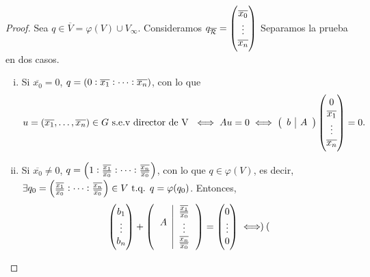  \begin{proof}
   Sea $q \in \overline{V} = \varphi(V) \cup V_\infty$. 
   Consideramos $q_{\overline{\mathcal{R}}} = \begin{pmatrix}
     \overline{x_0} \\ \vdots \\ \overline{x_n} 
   \end{pmatrix}$
   Separamos la prueba en dos casos.
   \begin{enumerate}[i)]
       \item Si $\overline{x_0} = 0$, $q = \left( 0:\overline{x_1}:\dots:\overline{x_n}\right)$, con
         lo que
         \[u = \left( \overline{x_1},\dots,\overline{x_n} \right) \in G \text{ s.e.v director
         de V } \iff Au = 0 \iff 
         \left( 
         \begin{array}{c|c} 
           b & A 
         \end{array}
         \right)
         \begin{pmatrix}
           0 \\
           \overline{x_1} \\
           \vdots \\
           \overline{x_n}
         \end{pmatrix}
         = 0.
       \]
     \item Si $\overline{x_0} \neq 0$, $q = \left( 1 : \frac{\overline{x_1}}{\overline{x_0}}
       : \dots : \frac{\overline{x_n}}{\overline{x_0}} \right)$, con lo que $q \in \varphi(V)$,
       es decir, $\exists q_0 =  \left( \frac{\overline{x_1}}{\overline{x_0}}
       : \dots : \frac{\overline{x_n}}{\overline{x_0}} \right) \in V \text{ t.q. } 
       q = \varphi(q_0)$. Entonces, 
       \begin{gather*} 
   \begin{pmatrix}
     b_1 \\ \vdots \\ b_n
   \end{pmatrix}
   +
   \lp
   \begin{tabular}{c|c} 
     \multirow{3}{*}{$A$} & $\frac{\overline{x_1}}{\overline{x_0}}$\\ 
     & $\vdots$  \\ & $ \frac{\overline{x_n}}{\overline{x_0}}$
    \end{tabular} 
    \rp
    =
    \begin{pmatrix}
     0 \\ \vdots \\ 0
   \end{pmatrix}
   \iff
\begin{pmatrix}

\end{pmatrix}
\end{gather*}
\end{enumerate}
\end{proof}
